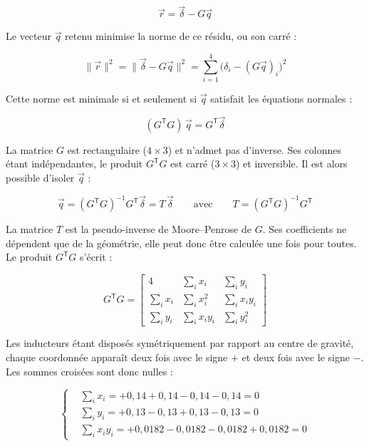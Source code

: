 \begin{equation}
    \vec{r} = \vec{\delta} - G\vec{q}
\end{equation}

Le vecteur $\vec{q}$ retenu minimise la norme de ce résidu, ou son carré :

\begin{equation}
    \bigl\lVert \vec{r} \bigr\rVert^{2}
    = \bigl\lVert \vec{\delta} - G\vec{q} \bigr\rVert^{2}
    = \sum_{i=1}^{4} \bigl(\delta_i - (G\vec{q})_i\bigr)^{2}
\end{equation}

Cette norme est minimale si et seulement si $\vec{q}$ satisfait les équations normales :

\begin{equation}
    (G^{\mathsf T}G)\,\vec{q} = G^{\mathsf T}\vec{\delta}
\end{equation}

La matrice $G$ est rectangulaire ($4\times3$) et n'admet pas d'inverse. Ses colonnes étant indépendantes, le produit $G^{\mathsf T}G$ est carré ($3\times3$) et inversible. Il est alors possible d'isoler $\vec{q}$ :

\begin{equation}
    \vec{q} = (G^{\mathsf T}G)^{-1} G^{\mathsf T} \vec{\delta}
    = T\,\vec{\delta}
    \qquad \text{avec} \qquad
    T = (G^{\mathsf T}G)^{-1} G^{\mathsf T}
\end{equation}

La matrice $T$ est la pseudo-inverse de Moore--Penrose \cite{Pseudoinverse} de $G$. Ses coefficients ne dépendent que de la géométrie, elle peut donc être calculée une fois pour toutes. Le produit $G^{\mathsf T}G$ s'écrit :

\begin{equation}
    G^{\mathsf T}G
    = \begin{bmatrix}
        4          & \sum_i x_i     & \sum_i y_i     \\[4pt]
        \sum_i x_i & \sum_i x_i^{2} & \sum_i x_i y_i \\[4pt]
        \sum_i y_i & \sum_i x_i y_i & \sum_i y_i^{2}
    \end{bmatrix}
\end{equation}

Les inducteurs étant disposés symétriquement par rapport au centre de gravité, chaque coordonnée apparaît deux fois avec le signe $+$ et deux fois avec le signe $-$. Les sommes croisées sont donc nulles :

\begin{equation}
    \left\{
    \begin{aligned}
         & \sum_i x_i     = +0{,}14 + 0{,}14 - 0{,}14 - 0{,}14 = 0         \\
         & \sum_i y_i     = +0{,}13 - 0{,}13 + 0{,}13 - 0{,}13 = 0         \\
         & \sum_i x_i y_i = +0{,}0182 - 0{,}0182 - 0{,}0182 + 0{,}0182 = 0
    \end{aligned}
    \right.
\end{equation}

